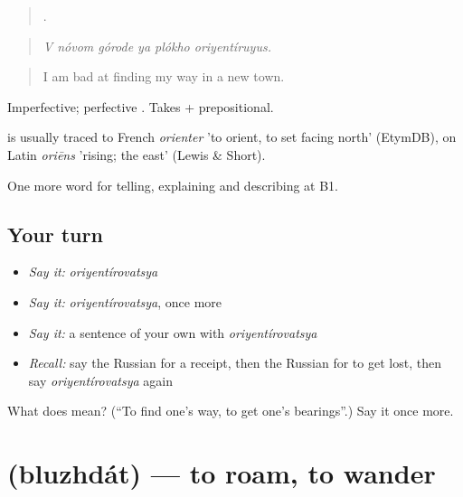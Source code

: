 \begin{quote}
     .
\end{quote}

\begin{quote}
\emph{V nóvom górode ya plókho oriyentíruyus.}
\end{quote}

\begin{quote}
I am bad at finding my way in a new town.
\end{quote}

Imperfective; perfective \emph{}. Takes \emph{} + prepositional.

\begin{cousinweb}
\emph{} is usually traced to French \emph{orienter} 'to orient, to set facing north' (EtymDB), on Latin \emph{oriēns} 'rising; the east' (Lewis \& Short).
\end{cousinweb}

\begin{grammarlens}[title={What you've built}]
One more word for telling, explaining and describing at B1.
\end{grammarlens}

\subsection*{Your turn}
\begin{itemize}
\raggedright
  \item \emph{Say it:} \emph{oriyentírovatsya}
  \item \emph{Say it:} \emph{oriyentírovatsya}, once more
  \item \emph{Say it:} a sentence of your own with \emph{oriyentírovatsya}
  \item \emph{Recall:} say the Russian for a receipt, then the Russian for to get lost, then say \emph{oriyentírovatsya} again
\end{itemize}

\begin{tcolorbox}[breakable,colback=teal!4,colframe=teal!35!black,title={Before you move on}]
What does  mean? (\textquotedblleft{}To find one's way, to get one's bearings\textquotedblright{}.) Say it once more.
\end{tcolorbox}
\section[\texorpdfstring{\ru{блуждать} (bluzhdát)}{блуждать (bluzhdát)}]{ (bluzhdát) — to roam, to wander}

